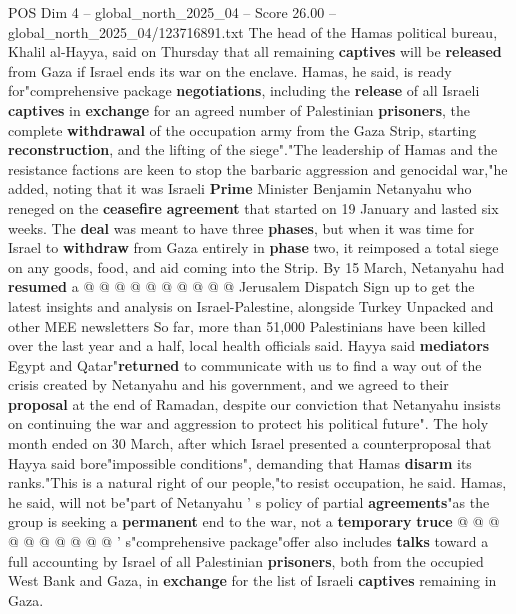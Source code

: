 \begin{textsample}{POS Dim 4 – global\_north\_2025\_04 – Score 26.00 – global\_north\_2025\_04/123716891.txt}  \label{ex:f4_pos_212}
The head of the Hamas political bureau, Khalil al-Hayya, said on Thursday that all remaining \textbf{captives} will be \textbf{released} from Gaza if Israel ends its war on the enclave.
Hamas, he said, is ready for"comprehensive package \textbf{negotiations}, including the \textbf{release} of all Israeli \textbf{captives} in \textbf{exchange} for an agreed number of Palestinian \textbf{prisoners}, the complete \textbf{withdrawal} of the occupation army from the Gaza Strip, starting \textbf{reconstruction}, and the lifting of the siege"."The leadership of Hamas and the resistance factions are keen to stop the barbaric aggression and genocidal war,"he added, noting that it was Israeli \textbf{Prime} Minister Benjamin Netanyahu who reneged on the \textbf{ceasefire} \textbf{agreement} that started on 19 January and lasted six weeks.
The \textbf{deal} was meant to have three \textbf{phases}, but when it was time for Israel to \textbf{withdraw} from Gaza entirely in \textbf{phase} two, it reimposed a total siege on any goods, food, and aid coming into the Strip.
By 15 March, Netanyahu had \textbf{resumed} a @ @ @ @ @ @ @ @ @ @ Jerusalem Dispatch Sign up to get the latest insights and analysis on Israel-Palestine, alongside Turkey Unpacked and other MEE newsletters So far, more than 51,000 Palestinians have been killed over the last year and a half, local health officials said.
Hayya said \textbf{mediators} Egypt and Qatar"\textbf{returned} to communicate with us to find a way out of the crisis created by Netanyahu and his government, and we agreed to their \textbf{proposal} at the end of Ramadan, despite our conviction that Netanyahu insists on continuing the war and aggression to protect his political future".
The holy month ended on 30 March, after which Israel presented a counterproposal that Hayya said bore"impossible conditions", demanding that Hamas \textbf{disarm} its ranks."This is a natural right of our people,"to resist occupation, he said.
Hamas, he said, will not be"part of Netanyahu ' s policy of partial \textbf{agreements}"as the group is seeking a \textbf{permanent} end to the war, not a \textbf{temporary} \textbf{truce} @ @ @ @ @ @ @ @ @ @ ' s"comprehensive package"offer also includes \textbf{talks} toward a full accounting by Israel of all Palestinian \textbf{prisoners}, both from the occupied West Bank and Gaza, in \textbf{exchange} for the list of Israeli \textbf{captives} remaining in Gaza.

\end{textsample}
